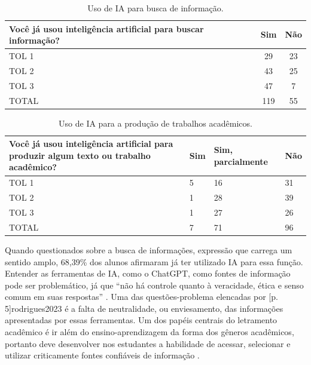 \documentclass[portuguese]{textolivre}
\begin{document}
\begin{table}[h!]
\centering
\begin{threeparttable}
\caption{Uso de IA para busca de informação.}\label{tab-1}
\begin{tabular}{lcc}
\toprule
Você já usou inteligência artificial para buscar informação? & Sim & Não \\
\midrule
TOL 1 & 29 & 23 \\
TOL 2 & 43 & 25 \\
TOL 3 & 47 & 7 \\
TOTAL & 119 & 55 \\
\bottomrule
\end{tabular}
\end{threeparttable}
\end{table}

\begin{table}[h!]
\centering
\begin{threeparttable}
\caption{Uso de IA para a produção de trabalhos acadêmicos.}\label{tab-2}
\begin{tabularx}{\linewidth}{Xlll}
\toprule
Você já usou inteligência artificial para produzir algum texto ou trabalho acadêmico? & Sim & Sim, parcialmente & Não \\
\midrule
TOL 1 & 5 & 16 & 31 \\
TOL 2 & 1 & 28 & 39 \\
TOL 3 & 1 & 27 & 26 \\
TOTAL & 7 & 71 & 96 \\
\bottomrule
\end{tabularx}
\end{threeparttable}
\end{table}


Quando questionados sobre a busca de informações, expressão que carrega um sentido amplo, 68,39\% dos alunos afirmaram já ter utilizado IA para essa função. Entender as ferramentas de IA, como o ChatGPT, como fontes de informação pode ser problemático, já que ``não há controle quanto à veracidade, ética e senso comum em suas respostas'' \cite[p. 6]{rodrigues2023}. Uma das questões-problema elencadas por [p. 5]{rodrigues2023} é a falta de neutralidade, ou enviesamento, das informações apresentadas por essas ferramentas. Um dos papéis centrais do letramento acadêmico é ir além do ensino-aprendizagem da forma dos gêneros acadêmicos, portanto deve desenvolver nos estudantes a habilidade de acessar, selecionar e utilizar criticamente fontes confiáveis de informação \cite{amaral2025}.
\end{document}
